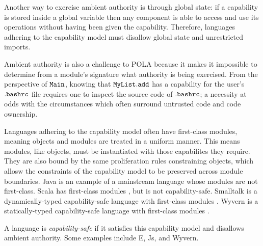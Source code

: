 Another way to exercise ambient authority is through global state: if a capability is stored inside a global variable then any component is able to access and use its operations without having been given the capability. Therefore, languages adhering to the capability model must disallow global state and unrestricted imports.

Ambient authority is also a challenge to POLA because it makes it impossible to determine from a module's signature what authority is being exercised. From the perspective of $\mathtt{Main}$, knowing that $\mathtt{MyList.add}$ has a capability for the user's $\mathtt{.bashrc}$ file requires one to inspect the source code of $\mathtt{.bashrc}$; a necessity at odds with the circumstances which often surround untrusted code and code ownership.

Languages adhering to the capability model often have first-class modules, meaning objects and modules are treated in a uniform manner. This means modules, like objects, must be instantiated with those capabilites they require. They are also bound by the same proliferation rules constraining objects, which allosw the constraints of the capability model to be preserved across module boundaries. Java is an example of a mainstream language whose modules are not first-class. Scala has first-class modules \cite{odersky16}, but is not capability-safe. Smalltalk is a dynamically-typed capability-safe language with first-class modules \cite{bracha10}. Wyvern is a statically-typed capability-safe language with first-class modules \cite{kurilova16}.

A language is \textit{capability-safe} if it satisfies this capability model and disallows ambient authority. Some examples include E, Js, and Wyvern. 
